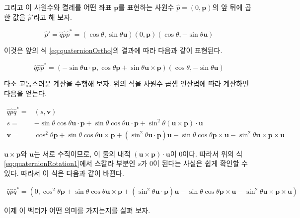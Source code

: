 그리고 이 사원수와 켤레를 어떤 좌표 $\mathbf p$를 표현하는 사원수 $\hat p = (0, \mathbf p)$의 앞 뒤에 곱한 값을
$\hat p'$라고 해 보자.

$$\hat p' = \hat q \hat p \hat p^* = (\cos \theta, \sin \theta \mathbf u) (0, \mathbf p) (\cos \theta, - \sin \theta \mathbf u)$$

이것은 앞의 식 \ref{eq:quaternionOrtho}의 결과에 따라 다음과 같이 표현된다.

$$\hat q \hat p \hat p^* = (-\sin \theta \mathbf u \cdot \mathbf p , \cos \theta \mathbf p + \sin \theta \mathbf u \times \mathbf p)  (\cos \theta, - \sin \theta \mathbf u)$$

다소 고통스러운 계산을 수행해 보자. 위의 식을 사원수 곱셈 연산법에 따라 계산하면 다음을 얻는다.

\begin{eqnarray}
\hat q \hat p \hat q^* =  &( s, \mathbf v) \\ \nonumber
s = & - \sin \theta \cos \theta \mathbf u \cdot \mathbf p + \sin \theta \cos \theta \mathbf u \cdot \mathbf p + \sin^2 \theta (\mathbf u \times \mathbf p ) \cdot \mathbf u \\ \nonumber
\mathbf v =  & \cos^2 \theta \mathbf p + \sin \theta \cos \theta \mathbf u \times \mathbf p + (\sin^2 \theta \mathbf u \cdot \mathbf p ) \mathbf u - \sin \theta \cos \theta \mathbf p \times \mathbf u - \sin^2 \theta \mathbf u \times \mathbf p \times \mathbf u 
\label{eq:quaternionRotation1}
\end{eqnarray}

$\mathbf u \times \mathbf p$와 $\mathbf u$는 서로 수직이므로,
이 둘의 내적 $(\mathbf u \times \mathbf p ) \cdot \mathbf u$이 0이다.
따라서 위의 식 \ref{eq:quaternionRotation1}에서 스칼라 부분인 $s$가 0이 된다는 사실은 쉽게 확인할 수 있다.
따라서 이 식은 다음과 같이 바뀐다.

\begin{eqnarray}
\hat q \hat p \hat q^* =  ( 0, \cos^2 \theta \mathbf p + \sin \theta \cos \theta \mathbf u \times \mathbf p + (\sin^2 \theta \mathbf u \cdot \mathbf p ) \mathbf u - \sin \theta \cos \theta \mathbf p \times \mathbf u - \sin^2 \theta \mathbf u \times \mathbf p \times \mathbf u )
\label{eq:quaternionRotation2}
\end{eqnarray}

이제 이 벡터가 어떤 의미를 가지는지를 살펴 보자.

